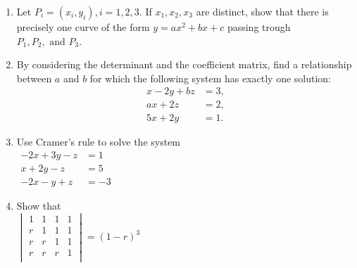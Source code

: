 \documentclass[../main.tex]{subfiles}
\begin{document}
\begin{enumerate}[label=\textbf{\thechapter.\arabic{*}}]
  \item \label{pr:4_5} Let \(P_i = (x_i,y_i), i = 1, 2, 3\). If \(x_1, x_2, x_3\) are distinct, show that there is precisely one curve of the form \(y = ax^2 + bx + c\) passing trough \(P_1, P_2, \text{ and } P_3\).
  
  \item \label{pr:4_6} By considering the determinant and the coefficient matrix, find a relationship between \(a\) and \(b\) for which the following system has exactly one solution:\begin{equation*}
    \begin{aligned}
      x - 2y + bz &= 3,\\
      ax + 2z &= 2,\\
      5x + 2y &= 1.
    \end{aligned}
  \end{equation*}
  
  \item \label{pr:4_7} Use Cramer's rule to solve the system\\
  \(\begin{aligned}
       -2x + 3y -z &= 1\\
       x + 2y -z &= 5\\
       -2x -y +z &= -3
     \end{aligned}\)
     
  \item \label{pr:4_8} Show that\\
  \(\begin{vmatrix}
      1 & 1 & 1 & 1\\
      r & 1 & 1 & 1\\
      r & r & 1 & 1\\
      r & r & r & 1\\
    \end{vmatrix}
    =(1-r)^3
  \)
  

\end{enumerate}
\end{document}
